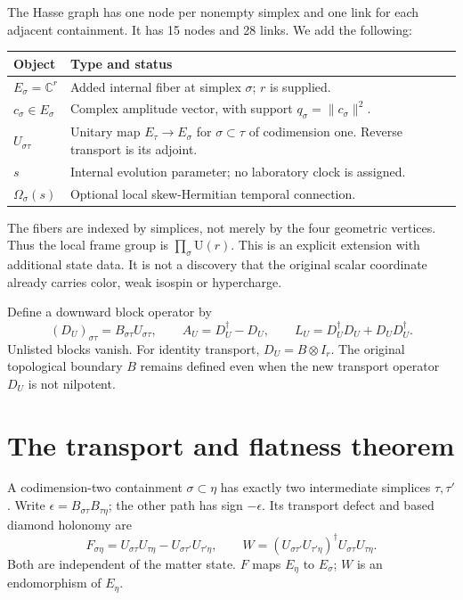 \documentclass[11pt,a4paper]{article}
\newcommand{\C}{\mathbb C}
\newcommand{\U}{\mathrm U}
\newcommand{\ad}{\dagger}
\begin{document}
The Hasse graph has one node per nonempty simplex and one link for each
adjacent containment. It has 15 nodes and 28 links. We add the following:
\begin{center}\small
\begin{tabular}{p{.24\linewidth}p{.67\linewidth}}
\toprule
Object & Type and status\\ \midrule
$E_\sigma=\C^r$ & Added internal fiber at simplex $\sigma$; $r$ is supplied.\\
$c_\sigma\in E_\sigma$ & Complex amplitude vector, with support $q_\sigma=\|c_\sigma\|^2$.\\
$U_{\sigma\tau}$ & Unitary map $E_\tau\to E_\sigma$ for $\sigma\subset\tau$ of codimension one. Reverse transport is its adjoint.\\
$s$ & Internal evolution parameter; no laboratory clock is assigned.\\
$\Omega_\sigma(s)$ & Optional local skew-Hermitian temporal connection.\\
\bottomrule
\end{tabular}
\end{center}
The fibers are indexed by simplices, not merely by the four geometric
vertices. Thus the local frame group is $\prod_\sigma\U(r)$.
This is an explicit extension with additional state data. It is not a
discovery that the original scalar coordinate already carries color,
weak isospin or hypercharge.

Define a downward block operator by
\[
 (D_U)_{\sigma\tau}=B_{\sigma\tau}U_{\sigma\tau},\qquad
 A_U=D_U^\ad-D_U,\qquad
 L_U=D_U^\ad D_U+D_UD_U^\ad.                         \tag{1}
\]
Unlisted blocks vanish. For identity transport, $D_U=B\otimes I_r$.
The original topological boundary $B$ remains defined even when the
new transport operator $D_U$ is not nilpotent.

\section{The transport and flatness theorem}
A codimension-two containment $\sigma\subset\eta$ has exactly two
intermediate simplices $\tau,\tau'$. Write
$\epsilon=B_{\sigma\tau}B_{\tau\eta}$; the other path has sign $-\epsilon$.
Its transport defect and based diamond holonomy are
\[
 F_{\sigma\eta}
 =U_{\sigma\tau}U_{\tau\eta}
  -U_{\sigma\tau'}U_{\tau'\eta},\qquad
 W=(U_{\sigma\tau'}U_{\tau'\eta})^\ad
       U_{\sigma\tau}U_{\tau\eta}.                   \tag{2}
\]
Both are independent of the matter state. $F$ maps $E_\eta$ to $E_\sigma$;
$W$ is an endomorphism of $E_\eta$.
\end{document}
